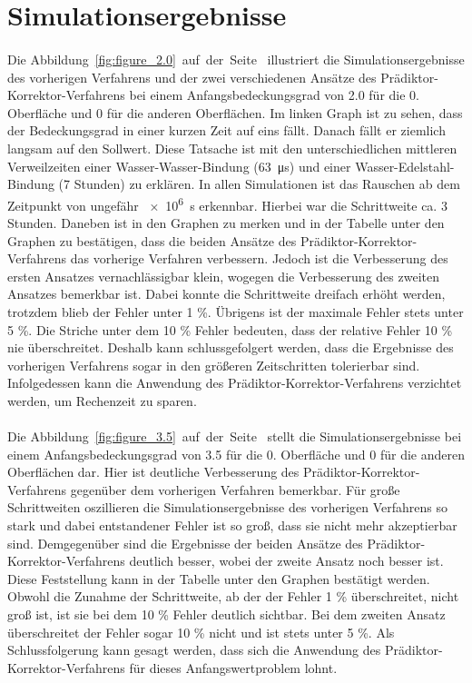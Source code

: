 \documentclass{listhesis}
\begin{document}
\section{Simulationsergebnisse} \label{section:simuergebnisse}
\paragraph{}
Die Abbildung~\ref{fig:figure_2.0}~auf~der~Seite~\pageref{fig:figure_2.0} illustriert die Simulationsergebnisse des vorherigen Verfahrens und der zwei verschiedenen Ansätze des Prädiktor-Korrektor-Verfahrens bei einem Anfangsbedeckungsgrad von 2.0 für die 0. Oberfläche und 0 für die anderen Oberflächen. Im linken Graph ist zu sehen, dass der Bedeckungsgrad in einer kurzen Zeit auf eins fällt. Danach fällt er ziemlich langsam auf den Sollwert. Diese Tatsache ist mit den unterschiedlichen mittleren Verweilzeiten einer Wasser-Wasser-Bindung (\SI{63}{\micro\s}) und einer Wasser-Edelstahl-Bindung (7 Stunden) zu erklären. In allen Simulationen ist das Rauschen ab dem Zeitpunkt von ungefähr \SI{e6}{\s} erkennbar. Hierbei war die Schrittweite ca. 3 Stunden. Daneben ist in den Graphen zu merken und in der Tabelle unter den Graphen zu bestätigen, dass die beiden Ansätze des Prädiktor-Korrektor-Verfahrens das vorherige Verfahren verbessern. Jedoch ist die Verbesserung des ersten Ansatzes vernachlässigbar klein, wogegen die Verbesserung des zweiten Ansatzes bemerkbar ist. Dabei konnte die Schrittweite dreifach erhöht werden, trotzdem blieb der Fehler unter 1 \%. Übrigens ist der maximale Fehler stets unter 5 \%. Die Striche unter dem 10 \% Fehler bedeuten, dass der relative Fehler 10 \% nie überschreitet. Deshalb kann schlussgefolgert werden, dass die Ergebnisse des vorherigen Verfahrens sogar in den größeren Zeitschritten tolerierbar sind. Infolgedessen kann die Anwendung des Prädiktor-Korrektor-Verfahrens verzichtet werden, um Rechenzeit zu sparen.

\paragraph{}
Die Abbildung~\ref{fig:figure_3.5}~auf~der~Seite~\pageref{fig:figure_3.5} stellt die Simulationsergebnisse bei einem Anfangsbedeckungsgrad von 3.5 für die 0. Oberfläche und 0 für die anderen Oberflächen dar. Hier ist deutliche Verbesserung des Prädiktor-Korrektor-Verfahrens gegenüber dem vorherigen Verfahren bemerkbar. Für große Schrittweiten oszillieren die Simulationsergebnisse des vorherigen Verfahrens so stark und dabei entstandener Fehler ist so groß, dass sie nicht mehr akzeptierbar sind. Demgegenüber sind die Ergebnisse der beiden Ansätze des Prädiktor-Korrektor-Verfahrens deutlich besser, wobei der zweite Ansatz noch besser ist. Diese Feststellung kann in der Tabelle unter den Graphen bestätigt werden. Obwohl die Zunahme der Schrittweite, ab der der Fehler 1 \% überschreitet, nicht groß ist, ist sie bei dem 10 \% Fehler deutlich sichtbar. Bei dem zweiten Ansatz überschreitet der Fehler sogar 10 \% nicht und ist stets unter 5 \%. Als Schlussfolgerung kann gesagt werden, dass sich die Anwendung des Prädiktor-Korrektor-Verfahrens für dieses Anfangswertproblem lohnt.
\end{document}
